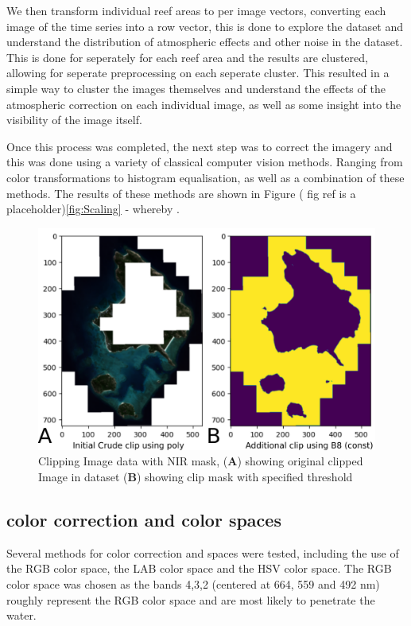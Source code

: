 \documentclass[journal,article,submit,pdftex,moreauthors]{Definitions/mdpi}
\begin{document}
We then transform individual reef areas to per image vectors, converting each image of the time series into a row vector, this is done to explore the dataset and understand the distribution of 
atmospheric effects and other noise in the dataset. This is done for seperately for each reef area and the results are clustered, allowing for seperate preprocessing
on each seperate cluster. This resulted in a simple way to cluster the images themselves and understand the effects of the atmospheric correction on each individual image, as well as some insight into
the visibility of the image itself. 

Once this process was completed, the next step was to correct the imagery and this was done using a variety of classical computer vision methods. Ranging from color transformations to 
histogram equalisation, as well as a combination of these methods. The results of these methods are shown in Figure ( fig ref is a placeholder)\ref{fig:Scaling} - whereby .




\begin{figure}
	\centering
	\includegraphics[width=0.7\linewidth]{Images/Preproc_Workflow.pdf}
	\caption{Clipping Image data with NIR mask, (\textbf{A}) showing original clipped Image in dataset (\textbf{B}) showing clip mask with specified threshold}
	\label{fig:PreprocWorkflow}
\end{figure}

\subsection*{color correction and color spaces}
Several methods for color correction and spaces were tested, including the use of the RGB color space, the LAB color space and the HSV color space. 
The RGB color space was chosen as the bands 4,3,2 (centered at 664, 559 and 492 nm) roughly represent the RGB color space and are most likely to penetrate the water.
\end{document}
